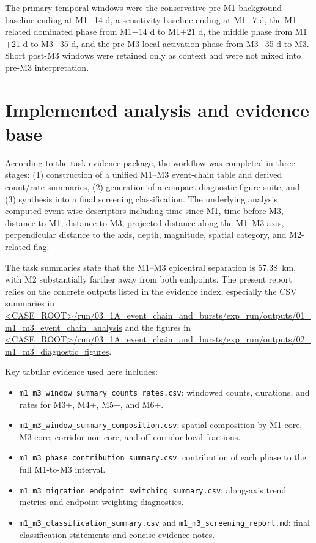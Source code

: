 \documentclass[11pt]{article}
\begin{document}
The primary temporal windows were the conservative pre-M1 background baseline ending at M1$-$14 d, a sensitivity baseline ending at M1$-$7 d, the M1-related dominated phase from M1$-$14 d to M1$+$21 d, the middle phase from M1$+$21 d to M3$-$35 d, and the pre-M3 local activation phase from M3$-$35 d to M3. Short post-M3 windows were retained only as context and were not mixed into pre-M3 interpretation.

\section{Implemented analysis and evidence base}
According to the task evidence package, the workflow was completed in three stages: (1) construction of a unified M1--M3 event-chain table and derived count/rate summaries, (2) generation of a compact diagnostic figure suite, and (3) synthesis into a final screening classification. The underlying analysis computed event-wise descriptors including time since M1, time before M3, distance to M1, distance to M3, projected distance along the M1--M3 axis, perpendicular distance to the axis, depth, magnitude, spatial category, and M2-related flag.

The task summaries state that the M1--M3 epicentral separation is \SI{57.38}{km}, with M2 substantially farther away from both endpoints. The present report relies on the concrete outputs listed in the evidence index, especially the CSV summaries in
\url{<CASE_ROOT>/run/03_1A_event_chain_and_bursts/exp_run/outputs/01_m1_m3_event_chain_analysis}
and the figures in
\url{<CASE_ROOT>/run/03_1A_event_chain_and_bursts/exp_run/outputs/02_m1_m3_diagnostic_figures}.

Key tabular evidence used here includes:
\begin{itemize}[leftmargin=1.5em]
    \item \texttt{m1\_m3\_window\_summary\_counts\_rates.csv}: windowed counts, durations, and rates for M3+, M4+, M5+, and M6+.
    \item \texttt{m1\_m3\_window\_summary\_composition.csv}: spatial composition by M1-core, M3-core, corridor non-core, and off-corridor local fractions.
    \item \texttt{m1\_m3\_phase\_contribution\_summary.csv}: contribution of each phase to the full M1-to-M3 interval.
    \item \texttt{m1\_m3\_migration\_endpoint\_switching\_summary.csv}: along-axis trend metrics and endpoint-weighting diagnostics.
    \item \texttt{m1\_m3\_classification\_summary.csv} and \texttt{m1\_m3\_screening\_report.md}: final classification statements and concise evidence notes.
\end{itemize}
\end{document}
